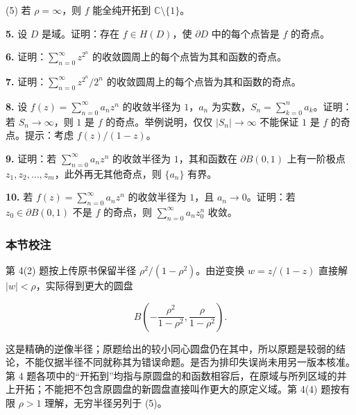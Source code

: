\documentclass[11pt,a4paper]{article}
\begin{document}
(5) 若 \(\rho=\infty\)，则 \(f\) 能全纯开拓到
\(\mathbb C\setminus\{1\}\)。

\par{}
\noindent\textbf{5.} 设 \(D\) 是域。证明：存在 \(f\in H(D)\)，使 \(\partial D\)
中的每个点皆是 \(f\) 的奇点。

\par{}
\noindent\textbf{6.} 证明：\(\sum_{n=0}^{\infty}z^{2^n}\)
的收敛圆周上的每个点皆为其和函数的奇点。

\par{}
\noindent\textbf{7.} 证明：\(\sum_{n=0}^{\infty}z^{2^n}/2^n\)
的收敛圆周上的每个点皆为其和函数的奇点。

\par{}
\noindent\textbf{8.} 设 \(f(z)=\sum_{n=0}^{\infty}a_nz^n\) 的收敛半径为
\(1\)，\(a_n\) 为实数，\(S_n=\sum_{k=0}^na_k\)。证明：若
\(S_n\to\infty\)，则 \(1\) 是 \(f\) 的奇点。举例说明，仅仅
\(|S_n|\to\infty\) 不能保证 \(1\) 是 \(f\) 的奇点。提示：考虑
\(f(z)/(1-z)\)。

\par{}
\noindent\textbf{9.} 证明：若 \(\sum_{n=0}^{\infty}a_nz^n\) 的收敛半径为
\(1\)，其和函数在 \(\partial B(0,1)\) 上有一阶极点
\(z_1,z_2,\ldots,z_m\)，此外再无其他奇点，则 \(\{a_n\}\) 有界。

\par{}
\noindent\textbf{10.} 若 \(f(z)=\sum_{n=0}^{\infty}a_nz^n\) 的收敛半径为
\(1\)，且 \(a_n\to0\)。证明：若 \(z_0\in\partial B(0,1)\) 不是 \(f\)
的奇点，则 \(\sum_{n=0}^{\infty}a_nz_0^n\) 收敛。

\subsubsection{本节校注}\label{ch06-practice-ux672cux8282ux6821ux6ce8-1}

第 4(2) 题按上传原书保留半径 \(\rho^2/(1-\rho^2)\)。由逆变换
\(w=z/(1-z)\) 直接解 \(|w|<\rho\)，实际得到更大的圆盘

\[
B\left(-\frac{\rho^2}{1-\rho^2},\frac\rho{1-\rho^2}\right).
\]

这是精确的逆像半径；原题给出的较小同心圆盘仍在其中，所以原题是较弱的结论，不能仅据半径不同就称其为错误命题。是否为排印失误尚未用另一版本核准。第
4
题各项中的``开拓到''均指与原圆盘的和函数相容后，在原域与所列区域的并上开拓；不能把不包含原圆盘的新圆盘直接叫作更大的原定义域。第
4(4) 题按有限 \(\rho>1\) 理解，无穷半径另列于 (5)。
\end{document}
